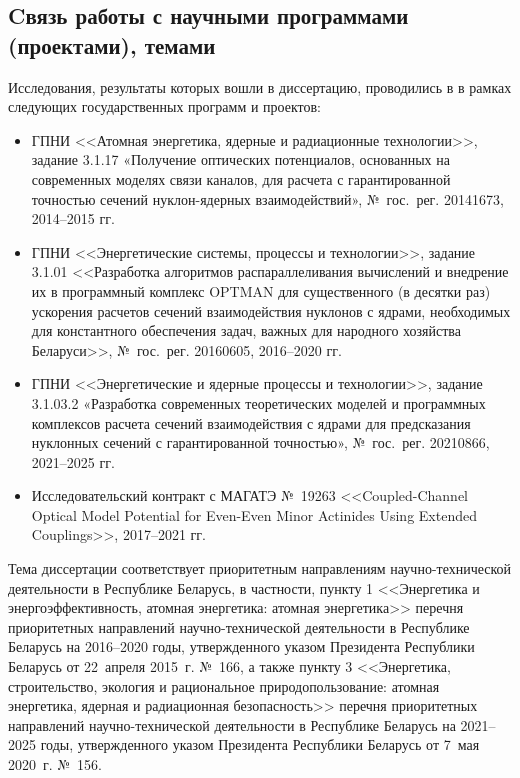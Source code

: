 

\subsection*{Cвязь работы с научными программами (проектами), темами}

Исследования, результаты которых вошли в диссертацию, проводились в {\thesisInOrganization} в рамках следующих государственных программ и проектов:

\begin{itemize}
	\item ГПНИ <<Атомная энергетика, ядерные и радиационные технологии>>, задание 3.1.17 «Получение оптических потенциалов, основанных на современных моделях связи каналов, для расчета с гарантированной точностью сечений нуклон-ядерных взаимодействий», №~гос.~рег. 20141673, 2014--2015 гг.
	\item ГПНИ <<Энергетические системы, процессы и технологии>>, задание 3.1.01 <<Разработка алгоритмов распараллеливания вычислений и внедрение их в программный комплекс OPTMAN для существенного (в десятки раз) ускорения расчетов сечений взаимодействия нуклонов с ядрами, необходимых для константного обеспечения задач, важных для народного хозяйства Беларуси>>, №~гос.~рег. 20160605, 2016--2020 гг.
	\item ГПНИ <<Энергетические и ядерные процессы и технологии>>, задание 3.1.03.2 «Разработка современных теоретических моделей и программных комплексов расчета сечений взаимодействия с ядрами для предсказания нуклонных сечений с гарантированной точностью», №~гос.~рег. 20210866, 2021--2025 гг.
	\item Исследовательский контракт с МАГАТЭ №~19263 <<Coupled-Channel Optical Model Potential for Even-Even Minor Actinides Using Extended Couplings>>, 2017--2021 гг.
\end{itemize}

Тема диссертации соответствует приоритетным направлениям научно-технической деятельности в Республике Беларусь, в частности, пункту 1 <<Энергетика и энергоэффективность, атомная энергетика: атомная энергетика>> перечня приоритетных направлений научно-технической деятельности в Республике Беларусь на 2016--2020 годы, утвержденного указом Президента Республики Беларусь от 22~апреля 2015~г. №~166, а также пункту 3 <<Энергетика, строительство, экология и рациональное природопользование: атомная энергетика, ядерная и радиационная безопасность>> перечня приоритетных направлений научно-технической деятельности в Республике Беларусь на 2021--2025 годы, утвержденного указом Президента Республики Беларусь от 7~мая 2020~г. №~156.

